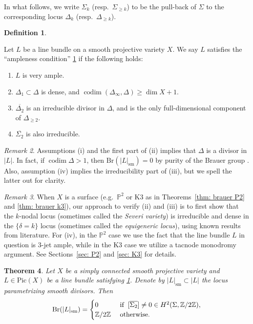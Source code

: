 \documentclass[11pt]{amsart}
\makeatletter
\theoremstyle{plain}
\newtheorem{thm}{Theorem}[section]
\theoremstyle{definition}
\newtheorem{defn}[thm]{Definition}
\theoremstyle{remark}
\newtheorem{rmk}[thm]{Remark}
\newcommand{\customlabel}[2]{%
   \protected@edef\@currentlabel{#2}\label{#1}%
}
\makeatother
\begin{document}
     \smallskip

     In what follows, we write $\Sigma_k$ (resp.~$\Sigma_{\geq k}$) to be the pull-back of $\Sigma$ to the corresponding locus $\Delta_k$ (resp.~$\Delta_{\geq k}$). 


\begin{defn}\customlabel{defn: ampleness}{$(\dagger)$}
    Let $L$ be a line bundle on a smooth projective variety $X$. We say $L$ satisfies the ``ampleness condition'' \ref{defn: ampleness} if the following holds:
\begin{enumerate}
    \item $L$ is very ample.
    \item $\Delta_1 \subset \Delta$ is dense, and $\operatorname{codim}(\Delta_\infty, \Delta)\geq \dim X + 1$.
    \item $\overline{\Delta_{2}}$ is an irreducible divisor in $\Delta$, and is the only full-dimensional component of $\Delta_{\geq 2}$.

    \item $\overline{\Sigma_2}$ is also irreducible.
\end{enumerate}
\end{defn}

\begin{rmk}
    Assumptions (i) and the first part of (ii) implies that $\Delta$ is a divisor in $|L|$. In fact, if $\operatorname{codim} \Delta >1$, then $\mathrm{Br}(|L|_\mathrm{sm}) = 0$ by purity of the Brauer group \cite{Brauerpurity}. Also, assumption (iv) implies the irreducibility part of (iii), but we spell the latter out for clarity.
    \end{rmk}

    \begin{rmk} \label{rmk: strategy to check dagger}
    When $X$ is a surface (e.g.~$\mathbb P^2$ or K3 as in Theorems~\ref{thm: brauer P2} and \ref{thm: brauer k3}), our approach to verify (ii) and (iii) is to first show that the $k${-nodal} locus (sometimes called the \textit{Severi variety}) is irreducible and dense in the $\{\delta = k\}$ locus (sometimes called the \textit{equigeneric locus}), using known results from literature. For (iv), in the $\mathbb P^2$ case we use the fact that the line bundle $L$ in question is $3$-jet ample, while in the K3 case we utilize a tacnode monodromy argument. See Sections~\ref{sec: P2} and \ref{sec: K3} for details. %
\end{rmk}

\begin{thm}\label{thm:brauer_base}
    Let $X$ be a simply connected smooth projective variety and $L\in \mathrm{Pic}(X)$ be a line bundle satisfying \ref{defn: ampleness}. Denote by $|L|_\mathrm{sm}\subset |L|$ the locus parametrizing smooth divisors. Then 
    \[\mathrm{Br}(|L|_\mathrm{sm}) = \begin{cases}0 & \text{  if \:} [\overline{\Sigma_{2}}] \neq 0 \in H^2(\Sigma, \mathbb Z / 2 \mathbb Z),\\ \mathbb Z / 2\mathbb Z & \text{  otherwise}.\end{cases}\]

\end{thm}
\end{document}
